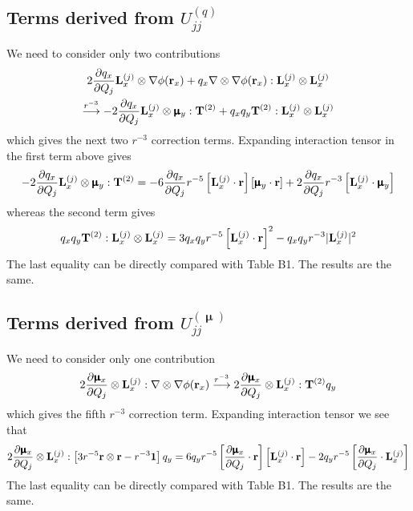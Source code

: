 \documentclass{exam}
\newcommand{\fderiv}[2]{\ensuremath{
\frac{\partial #1}{\partial #2}}}
\begin{document}
\begin{questions}
\begin{solution}
\subsection{Terms derived from $U_{jj}^{(q)}$}

We need to consider only two contributions
%
\begin{multline}
 2\fderiv{q_x}{Q_j} {\bf L}_x^{(j)} \otimes \nabla\phi({\bf r}_x) 
+ q_x \nabla\otimes\nabla\phi({\bf r}_x) : {\bf L}_x^{(j)} \otimes {\bf L}_x^{(j)}
\\  \overset{r^{-3}}{\longrightarrow}
 -2\fderiv{q_x}{Q_j} {\bf L}_x^{(j)} \otimes \pmb{\upmu}_y : {\bf T}^{(2)}
 + q_x q_y {\bf T}^{(2)} : {\bf L}_x^{(j)} \otimes {\bf L}_x^{(j)}
\end{multline}
%
which gives the next two $r^{-3}$ correction terms. Expanding interaction tensor
in the first term above gives
%
\begin{equation}
 -2\fderiv{q_x}{Q_j} {\bf L}_x^{(j)} \otimes \pmb{\upmu}_y : {\bf T}^{(2)} = 
 -6\fderiv{q_x}{Q_j} r^{-5} \left[ {\bf L}_x^{(j)} \cdot {\bf r} \right] 
                            \left[ \pmb{\upmu}_y \cdot {\bf r} \right] 
 +2\fderiv{q_x}{Q_j} r^{-3} \left[ {\bf L}_x^{(j)} \cdot  \pmb{\upmu}_y \right] 
\end{equation}
%
whereas the second term gives
%
\begin{equation}
 q_x q_y {\bf T}^{(2)} : {\bf L}_x^{(j)} \otimes {\bf L}_x^{(j)} = 
3q_x q_y r^{-5} \left[ {\bf L}_x^{(j)} \cdot {\bf r} \right]^2
-q_x q_y r^{-3} \lvert {\bf L}_x^{(j)} \rvert^2
\end{equation}
%
The last equality can be directly compared with Table B1. The results are the same.

\subsection{Terms derived from $U_{jj}^{(\pmb{\upmu})}$}

We need to consider only one contribution
%
\begin{equation}
 2\fderiv{\pmb{\upmu}_x}{Q_j} \otimes {\bf L}_x^{(j)} : \nabla\otimes\nabla\phi({\bf r}_x) 
 \overset{r^{-3}}{\longrightarrow}
 2\fderiv{\pmb{\upmu}_x}{Q_j} \otimes {\bf L}_x^{(j)} : {\bf T}^{(2)} q_y
\end{equation}
%
which gives the fifth $r^{-3}$ correction term. Expanding interaction tensor
we see that
%
\begin{equation}
 2\fderiv{\pmb{\upmu}_x}{Q_j} \otimes {\bf L}_x^{(j)} : 
               \left[ 3 r^{-5} {\bf r}\otimes {\bf r}  - r^{-3} {\bf 1}  \right]  q_y 
 = 6q_y r^{-5} \left[ \fderiv{\pmb{\upmu}_x}{Q_j} \cdot {\bf r} \right]
                \left[ {\bf L}_x^{(j)} \cdot {\bf r} \right] 
   -2q_y r^{-5} \left[ \fderiv{\pmb{\upmu}_x}{Q_j} \cdot {\bf L}_x^{(j)} \right]
%
\end{equation}
%
The last equality can be directly compared with Table B1. The results are the same.

\end{solution}
\end{questions}
\end{document}
